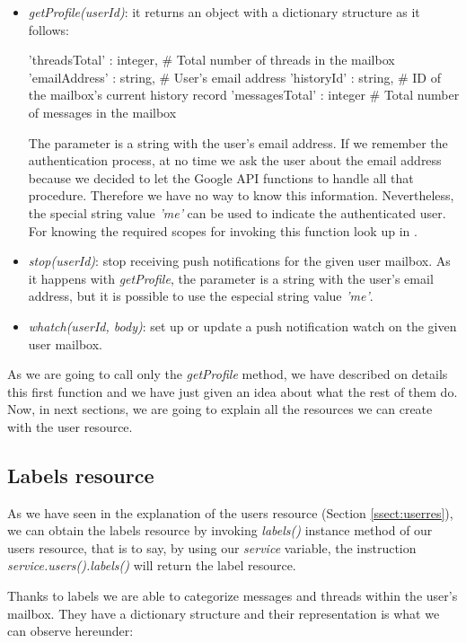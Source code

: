 \begin{itemize}
	\item\textit{getProfile(userId)}: it returns an object with a dictionary structure as it follows:
	\begin{python}
	{
	'threadsTotal' : integer, # Total number of threads in the mailbox
	'emailAddress' : string, # User's email address
	'historyId' : string, # ID of the mailbox's current history record
	'messagesTotal' : integer # Total number of messages in the mailbox
	}
	\end{python}
	The parameter is a string with the user's email address. If we remember the authentication process, at no time we ask the user about the email address because we decided to let the Google API functions to handle all that procedure. Therefore we have no way to know this information. Nevertheless, the special string value \textit{'me'} can be used to indicate the authenticated user. For knowing the required scopes for invoking this function look up in \cite[/v1/reference/users/getProfile]{gmailAPI}.
	\item\textit{stop(userId)}: stop receiving push notifications for the given user mailbox. As it happens with \textit{getProfile}, the parameter is a string with the user's email address, but it is possible to use the especial string value \textit{'me'}.
	\item\textit{whatch(userId, body)}: set up or update a push notification watch on the given user mailbox.
\end{itemize}

As we are going to call only the \textit{getProfile} method, we have described on details this first function and we have just given an idea about what the rest of them do. Now, in next sections, we are going to explain all the resources we can create with the user resource.

\subsection{Labels resource}\label{ssect:labres}
As we have seen in the explanation of the users resource (Section \ref{ssect:userres}), we can obtain the labels resource \citep[/v1/reference/users/labels]{gmailAPI} by invoking \textit{labels()} instance method of our users resource, that is to say, by using our \textit{service} variable, the instruction \textit{service.users().labels()} will return the label resource.

Thanks to labels we are able to categorize messages and threads within the user's mailbox. They have a dictionary structure and their representation is what we can observe hereunder:

